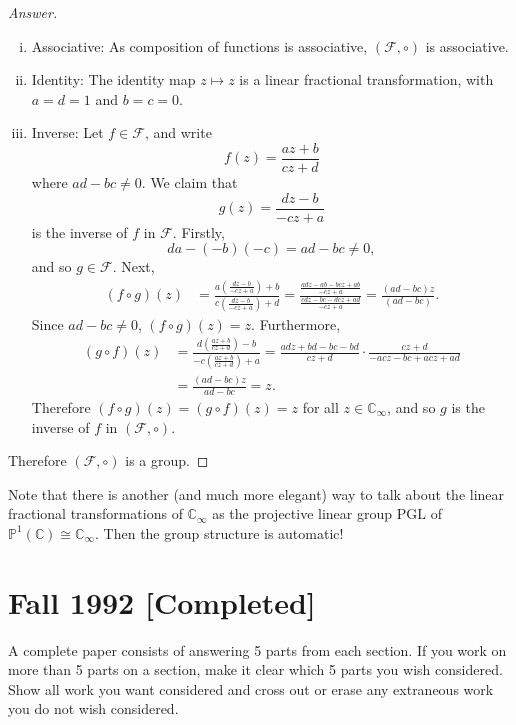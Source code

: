 \documentclass[12pt]{article}
\newcommand{\cx}{\mathbb{C}}
\newcommand{\p}{\mathbb{P}}
\newcommand\paren[1]{\left( #1 \right)}
\theoremstyle{definition}
\begin{document}
\begin{proof}[Answer]
\begin{enumerate}[(i)]
        \item Associative: As composition of functions is associative, $(\mathcal{F},\circ)$ is associative.
        \item Identity: The identity map $z \mapsto z$ is a linear fractional transformation, with $a = d = 1$ and $b = c = 0$.
        \item Inverse: Let $f \in \mathcal{F}$, and write 
        \[
            f(z) = \frac{az + b}{cz + d}
        \]
        where $ad - bc \neq 0$. We claim that 
        \[
            g(z) = \frac{dz - b}{-cz + a}
        \]
        is the inverse of $f$ in $\mathcal{F}$. Firstly, 
        \[
            da - (-b)(-c) = ad - bc \neq 0,
        \]
        and so $g \in \mathcal{F}$. Next, 
        \begin{align*}
            (f \circ g)(z) & = \frac{ a \paren{ \frac{dz - b}{-cz + a} } + b }{ c \paren{ \frac{dz - b}{-cz + a} } + d } = \frac{ \frac{adz - ab - bcz + ab }{ -cz + a } }{ \frac{ cdz - bc - dcz + ad }{ -cz + a } } = \frac{(ad - bc)z}{(ad - bc)}.
        \end{align*}
        Since $ad - bc \neq 0$, $(f \circ g)(z) = z$. Furthermore, 
        \begin{align*}
            (g \circ f)(z) & = \frac{ d \paren{ \frac{az + b}{cz + d} } - b }{-c \paren{ \frac{az + b}{cz + d} } + a } = \frac{adz + bd - bc - bd}{cz + d} \cdot \frac{cz + d}{-acz - bc + acz + ad} \\
            & = \frac{(ad - bc)z}{ad - bc} = z.
        \end{align*}
        Therefore $(f \circ g)(z) = (g \circ f)(z) = z$ for all $z \in \cx_{\infty}$, and so $g$ is the inverse of $f$ in $(\mathcal{F},\circ)$.
    \end{enumerate}
    Therefore $(\mathcal{F},\circ)$ is a group.
\end{proof}
Note that there is another (and much more elegant) way to talk about the linear fractional transformations of $\cx_{\infty}$ as the projective linear group $\mathrm{PGL}$ of $\p^1(\cx) \cong \cx_{\infty}$. Then the group structure is automatic!
\newpage
\section{Fall 1992 [Completed]}
A complete paper consists of answering 5 parts from each section. If you work on more than 5 parts on a section, make it clear which 5 parts you wish considered. Show all work you want considered and cross out or erase any extraneous work you do not wish considered.
\end{document}
